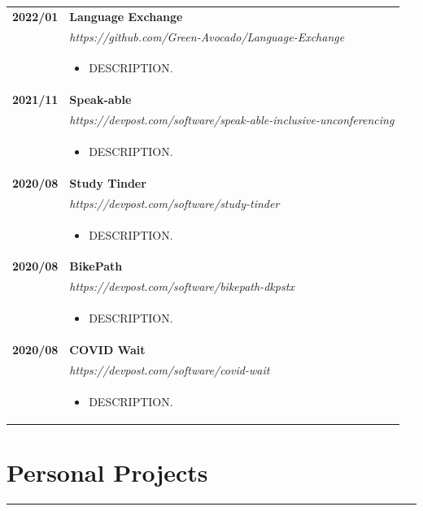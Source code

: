 \documentclass[letterpaper]{article}
\newcommand{\sect}[1]{\section*{#1}
                        {\color{cyan}
                        \rule{\textwidth}{1pt}
                        \vspace{-1ex}}}
\begin{document}
        \begin{tabular}{p{} p{}} 
            \textbf{2022/01} & \textbf{Language Exchange} \\
            & \emph{https://github.com/Green-Avocado/Language-Exchange} \\
            & \begin{itemize}
                \item DESCRIPTION.
            \end{itemize}
            \\
            \textbf{2021/11} & \textbf{Speak-able} \\
            & \emph{https://devpost.com/software/speak-able-inclusive-unconferencing} \\
            & \begin{itemize}
                \item DESCRIPTION.
            \end{itemize}
            \\
            \textbf{2020/08} & \textbf{Study Tinder} \\
            & \emph{https://devpost.com/software/study-tinder} \\
            & \begin{itemize}
                \item DESCRIPTION.
            \end{itemize}
            \\
            \textbf{2020/08} & \textbf{BikePath} \\
            & \emph{https://devpost.com/software/bikepath-dkpstx} \\
            & \begin{itemize}
                \item DESCRIPTION.
            \end{itemize}
            \\
            \textbf{2020/08} & \textbf{COVID Wait} \\
            & \emph{https://devpost.com/software/covid-wait} \\
            & \begin{itemize}
                \item DESCRIPTION.
            \end{itemize}
            \\
        \end{tabular}

    \sect{Personal Projects}
\end{document}
